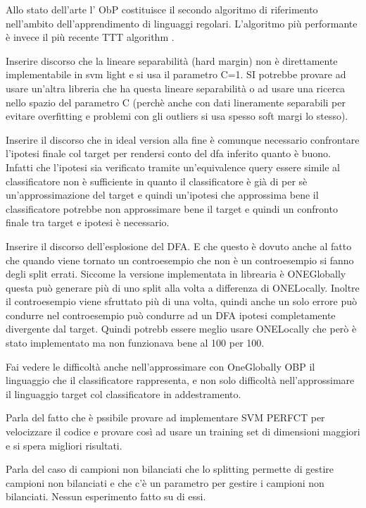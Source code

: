Allo stato dell'arte l' \ac{ObP} costituisce il secondo algoritmo di riferimento nell'ambito dell'apprendimento di linguaggi regolari.  L'algoritmo più performante è invece il più recente TTT algorithm \cite{SteffenTTT14}.

Inserire discorso che la lineare separabilità (hard margin) non è direttamente implementabile in svm light e si usa il parametro C=1. SI potrebbe provare ad usare un'altra libreria che ha questa lineare separabilità  o ad usare una ricerca nello spazio del parametro C (perchè anche con dati lineramente separabili per evitare overfitting e problemi con gli outliers si usa spesso soft margi lo stesso).

Inserire il discorso che in ideal version alla fine è comunque necessario confrontare l'ipotesi finale col target per rendersi conto del dfa inferito quanto è buono. Infatti che l'ipotesi sia verificato tramite un'equivalence query essere simile al classificatore non è sufficiente in quanto il classificatore è già di per sè un'approssimazione del target e quindi un'ipotesi che approssima bene il classificatore potrebbe non approssimare bene il target e quindi un confronto finale tra target e ipotesi è necessario. 

Inserire il discorso dell'esplosione del DFA. E che questo è dovuto anche al fatto che quando viene tornato un controesempio che non è un controesempio si fanno degli split errati. Siccome la versione implementata in librearia è ONEGlobally questa può generare più di uno split alla volta a differenza di ONELocally. Inoltre il controesempio viene sfruttato più di una volta, quindi anche un solo errore può condurre nel controesempio può condurre ad un DFA ipotesi completamente divergente dal target. Quindi potrebb essere meglio usare ONELocally che però è stato implementato ma non funzionava bene al 100 per 100.

Fai vedere le difficoltà anche nell'approssimare con OneGlobally OBP il linguaggio che il classificatore rappresenta, e non solo difficoltà nell'approssimare il linguaggio target col classificatore in addestramento.

Parla del fatto che è pssibile provare ad implementare SVM PERFCT per velocizzare il codice e provare così ad usare un training set di dimensioni maggiori e si spera migliori risultati.

Parla del caso di campioni non bilanciati che lo splitting permette di gestire campioni non bilanciati e che c'è un parametro per gestire i campioni non bilanciati. Nessun esperimento fatto su di essi.

